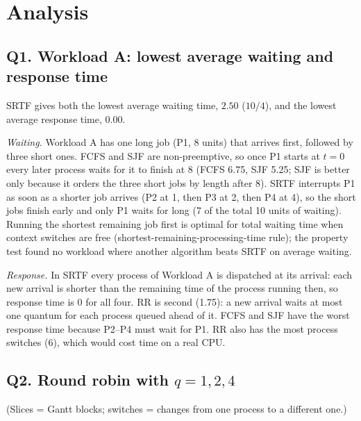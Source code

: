\documentclass[11pt,a4paper]{article}
\begin{document}
\section{Analysis}

\subsection*{Q1. Workload A: lowest average waiting and response time}

\begin{center}\end{center}
\begin{center}\end{center}

SRTF gives both the lowest average waiting time, $2.50$ ($10/4$), and the lowest average response time, $0.00$.

\emph{Waiting.} Workload A has one long job (P1, 8 units) that arrives first, followed by three short ones. FCFS and SJF
are non-preemptive, so once P1 starts at $t=0$ every later process waits for it to finish at 8 (FCFS 6.75, SJF 5.25; SJF
is better only because it orders the three short jobs by length after 8). SRTF interrupts P1 as soon as a shorter job
arrives (P2 at 1, then P3 at 2, then P4 at 4), so the short jobs finish early and only P1 waits for long (7 of the total
10 units of waiting). Running the shortest remaining job first is optimal for total waiting time when context switches are
free (shortest-remaining-processing-time rule); the property test found no workload where another algorithm beats SRTF on
average waiting.

\emph{Response.} In SRTF every process of Workload A is dispatched at its arrival: each new arrival is shorter than the
remaining time of the process running then, so response time is 0 for all four. RR is second (1.75): a new arrival waits at most one quantum for each process
queued ahead of it. FCFS and SJF have the worst response time because P2--P4 must wait for P1.
RR also has the most process switches (6), which would cost time on a real CPU.

\subsection*{Q2. Round robin with $q = 1, 2, 4$}

\begin{center}\end{center}
(Slices = Gantt blocks; switches = changes from one process to a different one.)
\end{document}
